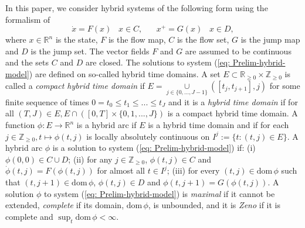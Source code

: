 \documentclass[a4paper, 9pt, twocolumn]{IEEEtran}
\theoremstyle{plain}
\theoremstyle{definition}
\newcommand{\dom}{\ensuremath{\text{dom}\,}}
\newcommand{\R}[2]{\ensuremath{\mathbb{R}^{#1}_{#2}}}
\newcommand{\Zp}{\ensuremath{\mathbb{Z}_{\geq 0}}}
\begin{document}
In this paper, we consider hybrid systems of the following form using the formalism of \cite{Teel}
\begin{equation}\label{eq: Prelim-hybrid-model}
  \dot{x} = F(x) \hspace{10pt} x\in C, \hspace{20pt} x^{+} = G(x) \hspace{10pt} x\in D,
\end{equation}
where $x\in \R{n}{}$ is the state, $F$ is the flow map, $C$ is the flow set, $G$ is the jump map and $D$ is the jump set. The vector fields $F$ and $G$ are assumed to be continuous and the sets $C$ and $D$ are closed. The solutions to system (\ref{eq: Prelim-hybrid-model}) are defined on so-called hybrid time domains. A set $E \subset \R{}{\geq0}\times \Zp$ is called a \textit{compact hybrid time domain} if $E =  \displaystyle \underset{j\in\{0,...,J-1\}}{\cup}([t_{j}, t_{j+1}], j)$ for some finite sequence of times $0=t_{0}\leq t_{1} \leq ... \leq t_{J}$ and it is a \textit{hybrid time domain} if for all $(T,J)\in E, E \cap ([0,T]\times \{0,1,...,J\})$ is a compact hybrid time domain. A function $\phi:E\rightarrow\R{n}{}$ is a hybrid arc if $E$ is a hybrid time domain and if for each $j\in\Zp, t \mapsto \phi(t,j)$ is locally absolutely continuous on $I^{j} := \{ t: (t,j)\in E \}$. A hybrid arc $\phi$ is a solution to system (\ref{eq: Prelim-hybrid-model}) if: (i) $\phi(0,0)\in C\cup D$; (ii) for any $j\in \Zp$, $\phi(t,j) \in C$ and $\dot{\phi}(t,j) = F(\phi(t,j))$ for almost all $t \in I^{j}$; (iii) for every $(t,j)\in \dom \phi$ such that $(t,j+1)\in \dom \phi$, $\phi(t,j) \in D$ and $\phi(t,j+1) = G(\phi(t,j))$. A solution $\phi$ to system (\ref{eq: Prelim-hybrid-model}) is \textit{maximal} if it cannot be extended, \textit{complete} if its domain, $\dom \phi$, is unbounded, and it is \textit{Zeno} if it is complete and $\sup_{t}\dom \phi< \infty$.
\end{document}
